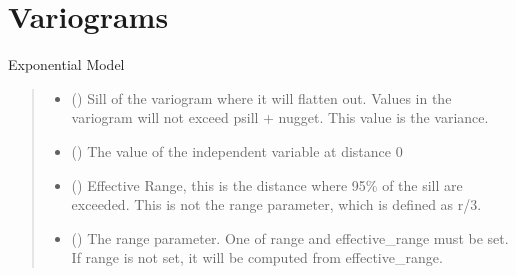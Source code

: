 \documentclass[letterpaper,10pt,english]{sphinxmanual}
\begin{document}
\section{Variograms}
\label{\detokenize{covariance:variograms}}

\begin{fulllineitems}
\label{\detokenize{covariance:glomar_gridding.variogram.ExponentialVariogram}}
\pysigstartsignatures
\pysiglinewithargsret
{}
{\sphinxparamcomma {}\sphinxparamcomma {}\sphinxparamcomma {}}
{}
\pysigstopsignatures
\sphinxAtStartPar
Exponential Model
\begin{quote}\begin{description}
\begin{itemize}
\item {}
\sphinxAtStartPar
{} () \textendash{} Sill of the variogram where it will flatten out. Values in the variogram
will not exceed psill + nugget. This value is the variance.

\item {}
\sphinxAtStartPar
{} () \textendash{} The value of the independent variable at distance 0

\item {}
\sphinxAtStartPar
{} () \textendash{} Effective Range, this is the distance where 95\% of the sill are
exceeded. This is not the range parameter, which is defined as r/3.

\item {}
\sphinxAtStartPar
{} () \textendash{} The range parameter. One of range and effective\_range must be set. If
range is not set, it will be computed from effective\_range.


\end{itemize}
\end{description}
\end{quote}
\end{fulllineitems}
\end{document}
